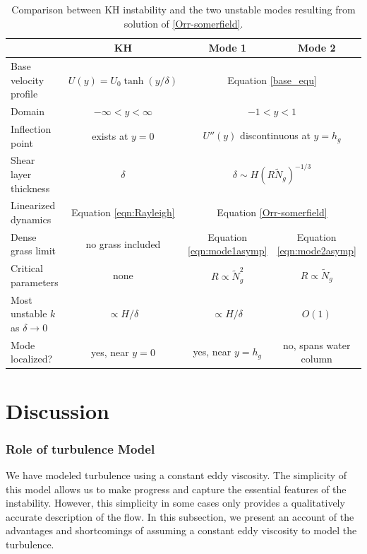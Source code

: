\documentclass[12pt]{report}   %
\newcommand{\hg}{h_g}
\newcommand{\Rey}{{R}}
\newcommand{\Ndg}{\tilde{N}_g}
\begin{document}
%
\begin{table}
{}  %
\renewcommand{\arraystretch}{1.2}
 \begin{tabular}{l|c|c|c}
			& KH 				& Mode 1 		& Mode 2 \\ \hline
 Base velocity profile 	& $U(y) = U_0 \tanh(y/\delta)$			& \multicolumn{2}{c}{Equation \eqref{base_equ}} \\
 Domain 		& $-\infty < y < \infty$			& \multicolumn{2}{c}{$-1<y<1$} \\
 Inflection point	& exists at $y=0$				& \multicolumn{2}{c}{$U''(y)$ discontinuous at $y=\hg$} \\
 Shear layer thickness	& $\delta$					& \multicolumn{2}{c}{$\delta \sim  H\left(\Rey \Ndg \right)^{-1/3}$} \\
 Linearized dynamics	& Equation \eqref{eqn:Rayleigh}		& \multicolumn{2}{c}{Equation \eqref{Orr-somerfield}} \\
 Dense grass limit &  no grass included & Equation \eqref{eqn:mode1asymp} & Equation \eqref{eqn:mode2asymp}  \\
 Critical parameters	& none						& $\Rey \propto \Ndg^{2}$ 	& $\Rey \propto \Ndg$ \\
 Most unstable $k$ as $\delta \to 0$	& $\propto H/\delta$		& $\propto H/\delta$	& $O(1)$ \\
 Mode localized?	& yes, near $y=0$				& yes, near $y=\hg$			& no, spans water column
 \end{tabular}
 \caption{Comparison between KH instability and the two unstable modes resulting from solution of \ref{Orr-somerfield}.}
 \label{tab:comparison}
\end{table}
\clearpage{\pagestyle{empty}\cleardoublepage}

\chapter{Discussion}
\subsection{Role of turbulence Model}
We have modeled turbulence using a constant eddy viscosity. 
The simplicity of this model allows us to make progress and capture the essential features of the instability. 
However, this simplicity in some cases only provides a qualitatively accurate description of the flow. 
In this subsection, we present an account of the advantages and shortcomings of assuming a constant eddy viscosity to model the turbulence.
\end{document}
